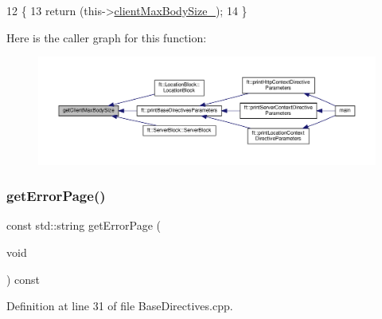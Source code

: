 \begin{DoxyCode}
12     \{
13         \textcolor{keywordflow}{return} (this->\hyperlink{classft_1_1_base_directives_ad65c2594d2a90ca065d410dfd4066a19}{clientMaxBodySize\_});
14     \}
\end{DoxyCode}
Here is the caller graph for this function\+:
\nopagebreak
\begin{figure}[H]
\begin{center}
\leavevmode
\includegraphics[width=350pt]{classft_1_1_base_directives_a930398ba1e4b99b2ba01a60dcda0c923_icgraph}
\end{center}
\end{figure}
\mbox{\label{classft_1_1_base_directives_a3cb0c21f17781de392d5ee09d7190caf}} 
\subsubsection{\texorpdfstring{get\+Error\+Page()}{getErrorPage()}}
{\footnotesize\ttfamily const std\+::string get\+Error\+Page (\begin{DoxyParamCaption}\item[{void}]{ }\end{DoxyParamCaption}) const\hspace{0.3cm}{\ttfamily [inherited]}}



Definition at line 31 of file Base\+Directives.\+cpp.


